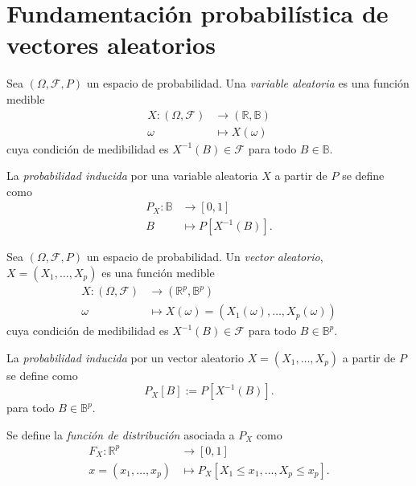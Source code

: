\section{Fundamentación probabilística de vectores aleatorios}

\begin{ndef}
    Sea $(\Omega, \mathcal{F}, P)$ un espacio de probabilidad. Una \textit{variable aleatoria} es una función medible
    \begin{align*}
    X:(\Omega, \mathcal{F}) &\rightarrow (\mathbb{R}, \mathbb{B})\\
    \omega &\mapsto X(\omega)
    \end{align*}
    cuya condición de medibilidad es \(X^{-1}(B) \in \mathcal{F}\) para todo \(B \in \mathbb{B}\).
\end{ndef}

\begin{ndef}
    La \textit{probabilidad inducida} por una variable aleatoria $X$ a partir de $P$ se define como
    \begin{align*}
    P_{X}:\mathbb{B} &\rightarrow [0,1] \\
    B &\mapsto P[X^{-1}(B)].
    \end{align*}
\end{ndef}

\begin{ndef}
    Sea $(\Omega, \mathcal{F}, P)$ un espacio de probabilidad. Un \textit{vector aleatorio}, $X = (X_1, \dots, X_p)$ es una función medible
    \begin{align*}
    X:(\Omega, \mathcal{F}) &\rightarrow (\mathbb{R}^p, \mathbb{B}^p) \\
    \omega &\mapsto X(\omega) = (X_1(\omega), \dots, X_p(\omega))
    \end{align*}
    cuya condición de medibilidad es \(X^{-1}(B) \in \mathcal{F}\) para todo \(B \in \mathbb{B}^p\).
\end{ndef}

\begin{ndef}
    La \textit{probabilidad inducida} por un vector aleatorio $X = (X_1, \dots, X_p)$ a partir de $P$ se define como
    \[
    P_X[B] := P[X^{-1}(B)]
    .\] para todo \(B \in \mathbb{B}^p\).
\end{ndef}

\begin{ndef}
    Se define la \textit{función de distribución} asociada a $P_X$ como
    \begin{align*}
    F_X:\mathbb{R}^p &\rightarrow [0,1] \\
    x=(x_1,\dots,x_p) &\mapsto P_X[X_1 \leq x_1, \dots, X_p \leq x_p]
    .\end{align*}
\end{ndef}


